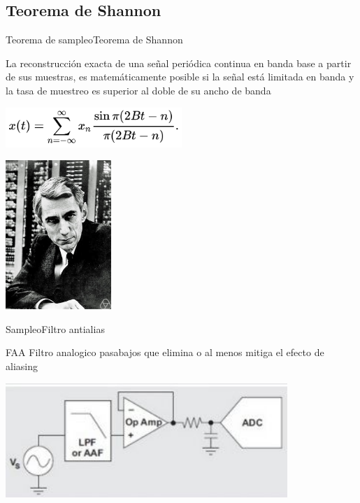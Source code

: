 \begin{darkframes}
   \subsection{Teorema de Shannon}
   \begin{frame}{Teorema de sampleo}{Teorema de Shannon}
      \begin{teorema}
       La reconstrucción exacta de una señal periódica continua en banda base a partir de sus muestras, es matemáticamente posible si la señal está limitada en banda y la tasa de muestreo es superior al doble de su ancho de banda
      \end{teorema}
      \center\includegraphics[width=0.5\textwidth]{1_clase/shannon}
      \par
      \center\includegraphics[width=0.3\textwidth]{1_clase/claude_shannon}
      \vfill
   \end{frame}

   \begin{frame}{Sampleo}{Filtro antialias}
      \begin{block}{FAA}
         Filtro \alert{analogico} pasabajos que elimina o al menos mitiga el efecto de aliasing
      \end{block}
      \center\includegraphics[width=0.8\textwidth]{1_clase/filtro_anti_aliasing}
      \vfill
   \end{frame}


\end{darkframes}
